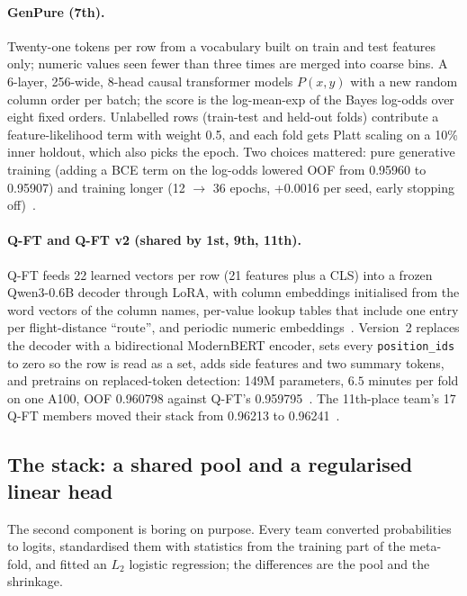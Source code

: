 \paragraph{GenPure (7th).}
Twenty-one tokens per row from a vocabulary built on train and test features only; numeric
values seen fewer than three times are merged into coarse bins. A 6-layer, 256-wide,
8-head causal transformer models $P(x,y)$ with a new random column order per batch; the
score is the log-mean-exp of the Bayes log-odds over eight fixed orders. Unlabelled rows
(train-test and held-out folds) contribute a feature-likelihood term with weight 0.5, and
each fold gets Platt scaling on a 10\% inner holdout, which also picks the epoch. Two
choices mattered: pure generative training (adding a BCE term on the log-odds lowered OOF
from 0.95960 to 0.95907) and training longer (12 $\to$ 36 epochs, +0.0016 per seed,
early stopping off)~\citep{kaggle_seventh}.

\paragraph{Q-FT and Q-FT v2 (shared by 1st, 9th, 11th).}
Q-FT feeds 22 learned vectors per row (21 features plus a CLS) into a frozen Qwen3-0.6B
decoder through LoRA, with column embeddings initialised from the word vectors of the column
names, per-value lookup tables that include one entry per flight-distance ``route'', and
periodic numeric embeddings~\citep{kaggle_qft}. Version~2 replaces the decoder with a
bidirectional ModernBERT encoder, sets every \texttt{position\_ids} to zero so the row is
read as a set, adds side features and two summary tokens, and pretrains on replaced-token
detection: 149M parameters, $6.5$ minutes per fold on one A100, OOF 0.960798 against Q-FT's
0.959795~\citep{kaggle_qft2,warner2024modernbert}. The 11th-place team's 17 Q-FT members
moved their stack from 0.96213 to 0.96241~\citep{kaggle_eleventh}.

\subsection{The stack: a shared pool and a regularised linear head}

The second component is boring on purpose. Every team converted probabilities to logits,
standardised them with statistics from the training part of the meta-fold, and fitted an
$L_2$ logistic regression; the differences are the pool and the shrinkage.

